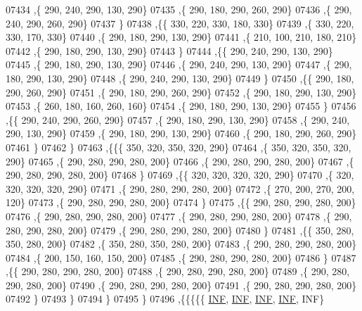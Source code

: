 \begin{DoxyCode}
07434     ,\{   290,   240,   290,   130,   290\}
07435     ,\{   290,   180,   290,   260,   290\}
07436     ,\{   290,   240,   290,   260,   290\}
07437     \}
07438    ,\{\{   330,   220,   330,   180,   330\}
07439     ,\{   330,   220,   330,   170,   330\}
07440     ,\{   290,   180,   290,   130,   290\}
07441     ,\{   210,   100,   210,   180,   210\}
07442     ,\{   290,   180,   290,   130,   290\}
07443     \}
07444    ,\{\{   290,   240,   290,   130,   290\}
07445     ,\{   290,   180,   290,   130,   290\}
07446     ,\{   290,   240,   290,   130,   290\}
07447     ,\{   290,   180,   290,   130,   290\}
07448     ,\{   290,   240,   290,   130,   290\}
07449     \}
07450    ,\{\{   290,   180,   290,   260,   290\}
07451     ,\{   290,   180,   290,   260,   290\}
07452     ,\{   290,   180,   290,   130,   290\}
07453     ,\{   260,   180,   160,   260,   160\}
07454     ,\{   290,   180,   290,   130,   290\}
07455     \}
07456    ,\{\{   290,   240,   290,   260,   290\}
07457     ,\{   290,   180,   290,   130,   290\}
07458     ,\{   290,   240,   290,   130,   290\}
07459     ,\{   290,   180,   290,   130,   290\}
07460     ,\{   290,   180,   290,   260,   290\}
07461     \}
07462    \}
07463   ,\{\{\{   350,   320,   350,   320,   290\}
07464     ,\{   350,   320,   350,   320,   290\}
07465     ,\{   290,   280,   290,   280,   200\}
07466     ,\{   290,   280,   290,   280,   200\}
07467     ,\{   290,   280,   290,   280,   200\}
07468     \}
07469    ,\{\{   320,   320,   320,   320,   290\}
07470     ,\{   320,   320,   320,   320,   290\}
07471     ,\{   290,   280,   290,   280,   200\}
07472     ,\{   270,   200,   270,   200,   120\}
07473     ,\{   290,   280,   290,   280,   200\}
07474     \}
07475    ,\{\{   290,   280,   290,   280,   200\}
07476     ,\{   290,   280,   290,   280,   200\}
07477     ,\{   290,   280,   290,   280,   200\}
07478     ,\{   290,   280,   290,   280,   200\}
07479     ,\{   290,   280,   290,   280,   200\}
07480     \}
07481    ,\{\{   350,   280,   350,   280,   200\}
07482     ,\{   350,   280,   350,   280,   200\}
07483     ,\{   290,   280,   290,   280,   200\}
07484     ,\{   200,   150,   160,   150,   200\}
07485     ,\{   290,   280,   290,   280,   200\}
07486     \}
07487    ,\{\{   290,   280,   290,   280,   200\}
07488     ,\{   290,   280,   290,   280,   200\}
07489     ,\{   290,   280,   290,   280,   200\}
07490     ,\{   290,   280,   290,   280,   200\}
07491     ,\{   290,   280,   290,   280,   200\}
07492     \}
07493    \}
07494   \}
07495  \}
07496 ,\{\{\{\{\{   \hyperlink{constants_8h_a12c2040f25d8e3a7b9e1c2024c618cb6}{INF},   \hyperlink{constants_8h_a12c2040f25d8e3a7b9e1c2024c618cb6}{INF},   \hyperlink{constants_8h_a12c2040f25d8e3a7b9e1c2024c618cb6}{INF},   \hyperlink{constants_8h_a12c2040f25d8e3a7b9e1c2024c618cb6}{INF},   INF\}

\end{DoxyCode}
